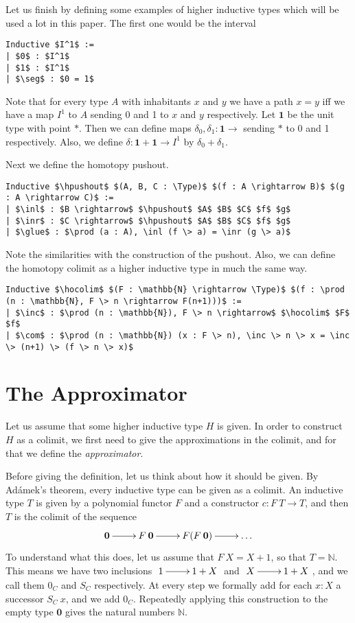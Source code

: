 \documentclass[a4paper,UKenglish]{lipics-v2016}
\newcommand{\zero}[0]{\textbf{0}}
\newcommand{\one}[0]{\textbf{1}}
\newcommand{\hpushout}[0]{\operatorname{\textbf{hpushout}}}
\newcommand{\hocolim}[0]{\operatorname{\textbf{hocolim}}}
\newcommand{\seg}[0]{\operatorname{\textbf{seg}}}
\newcommand{\inl}[0]{\operatorname{\textbf{inl}}}
\newcommand{\inr}[0]{\operatorname{\textbf{inr}}}
\newcommand{\glue}[0]{\operatorname{\textbf{glue}}}
\newcommand{\inc}[0]{\operatorname{\textbf{inc}}}
\newcommand{\com}[0]{\operatorname{\textbf{com}}}
\newcommand{\Type}[0]{\operatorname{\textsc{Type}}}
\newcommand{\pt}[0]{*}
\begin{document}
Let us finish by defining some examples of higher inductive types which will be used a lot in this paper.
The first one would be the interval
\lstset{language=Coq}
\begin{lstlisting}
Inductive $I^1$ :=
| $0$ : $I^1$
| $1$ : $I^1$
| $\seg$ : $0 = 1$
\end{lstlisting}
Note that for every type $A$ with inhabitants $x$ and $y$ we have a path $x = y$ iff we have a map $I^1$ to $A$ sending 0 and 1 to $x$ and $y$ respectively.
Let $\one$ be the unit type with point $\pt$.
Then we can define maps $\delta_0, \delta_1 : \one \rightarrow$ sending $\pt$ to 0 and 1 respectively.
Also, we define $\delta : \one + \one \rightarrow I^1$ by $\delta_0 + \delta_1$.

Next we define the homotopy pushout.
\lstset{language=Coq}
\begin{lstlisting}
Inductive $\hpushout$ $(A, B, C : \Type)$ $(f : A \rightarrow B)$ $(g : A \rightarrow C)$ :=
| $\inl$ : $B \rightarrow$ $\hpushout$ $A$ $B$ $C$ $f$ $g$
| $\inr$ : $C \rightarrow$ $\hpushout$ $A$ $B$ $C$ $f$ $g$
| $\glue$ : $\prod (a : A), \inl (f \> a) = \inr (g \> a)$
\end{lstlisting}
Note the similarities with the construction of the pushout.
Also, we can define the homotopy colimit as a higher inductive type in much the same way.
\lstset{language=Coq}
\begin{lstlisting}
Inductive $\hocolim$ $(F : \mathbb{N} \rightarrow \Type)$ $(f : \prod (n : \mathbb{N}, F \> n \rightarrow F(n+1)))$ :=
| $\inc$ : $\prod (n : \mathbb{N}), F \> n \rightarrow$ $\hocolim$ $F$ $f$
| $\com$ : $\prod (n : \mathbb{N}) (x : F \> n), \inc \> n \> x = \inc \> (n+1) \> (f \> n \> x)$
\end{lstlisting}

\section{The Approximator}
\label{sec:approximator}
Let us assume that some higher inductive type $H$ is given.
In order to construct $H$ as a colimit, we first need to give the approximations in the colimit, and for that we define the \emph{approximator}.

Before giving the definition, let us think about how it should be given.
By Ad\'amek's theorem, every inductive type can be given as a colimit.
An inductive type $T$ is given by a polynomial functor $F$ and a constructor $c : F \> T \rightarrow T$, and then $T$ is the colimit of the sequence
\[
\xymatrix
{
	\zero \ar[r] & F \> \zero  \ar[r] & F(F \> \zero) \ar[r] & \ldots
}
\]
To understand what this does, let us assume that $F \> X = X + 1$, so that $T = \mathbb{N}$.
This means we have two inclusions  $\xymatrix{1 \ar[r] & 1+X}$ and  $\xymatrix{X \ar[r] & 1+X}$, and we call them $0_C$ and $S_C$ respectively.
At every step we formally add for each $x : X$ a successor $S_C \> x$, and we add $0_C$.
Repeatedly applying this construction to the empty type $\zero$ gives the natural numbers $\mathbb{N}$.
\end{document}
